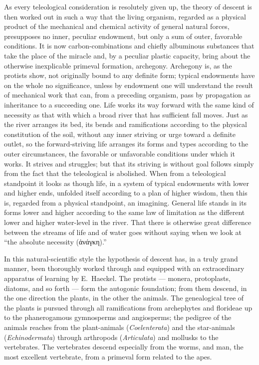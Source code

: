 \documentclass[12pt]{book}
\begin{document}
As every teleological consideration is resolutely given up, the theory of descent is then
worked out in such a way that the living organism, regarded as a physical product of the
mechanical and chemical activity of general natural forces, presupposes no inner, peculiar
endowment, but only a sum of outer, favorable conditions. It is now carbon-combinations and
chiefly albuminous substances that take the place of the miracle and, by a peculiar plastic
capacity, bring about the otherwise inexplicable primeval formation, archegony. Archegony
is, as the protists show, not originally bound to any definite form; typical endowments
have on the whole no significance, unless by endowment one will understand the result of
mechanical work that can, from a preceding organism, pass by propagation as inheritance to a
succeeding one. Life works its way forward with the same kind of necessity as that with
which a broad river that has sufficient fall moves. Just as the river arranges its bed, its
bends and ramifications according to the physical constitution of the soil, without any
inner striving or urge toward a definite outlet, so the forward-striving life arranges its
forms and types according to the outer circumstances, the favorable or unfavorable
conditions under which it works. It strives and struggles; but that its striving is without
goal follows simply from the fact that the teleological is abolished. When from a
teleological standpoint it looks as though life, in a system of typical endowments with
lower and higher ends, unfolded itself according to a plan of higher wisdom, then this is,
regarded from a physical standpoint, an imagining. General life stands in its forms lower
and higher according to the same law of limitation as the different lower and higher
water-level in the river. That there is otherwise great difference between the streams of
life and of water goes without saying when we look at ``the absolute necessity
(ἀνάγκη).''

In this natural-scientific style the hypothesis of descent has, in a truly grand manner,
been thoroughly worked through and equipped with an extraordinary apparatus of learning by
E.\ Haeckel. The protists --- monera, protoplasts, diatoms, and so forth --- form the
autogonic foundation; from them descend, in the one direction the plants, in the other the
animals. The genealogical tree of the plants is pursued through all ramifications from
archephytes and florideae up to the phanerogamous gymnosperms and angiosperms; the
pedigree of the animals reaches from the plant-animals (\textit{Coelenterata}) and the
star-animals (\textit{Echinodermata}) through arthropods (\textit{Articulata}) and mollusks
to the vertebrates. The vertebrates descend especially from the worms, and man, the most
excellent vertebrate, from a primeval form related to the apes.
\end{document}
